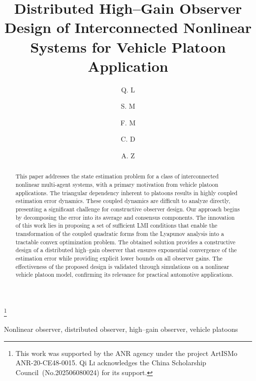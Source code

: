 \documentclass{ifacconf}
\begin{document}
\begin{frontmatter}

\title{Distributed High--Gain Observer Design of Interconnected Nonlinear Systems for Vehicle Platoon Application} 

\thanks[footnoteinfo]{This work was supported by the ANR agency under the project ArtISMo ANR-20-CE48-0015. 
Qi L\textsc{i} acknowledges the China Scholarship Council~(No.202506080024) for its support.}

\author[First]{Q. L} 
\author[First]{S. M}
\author[Second]{F. M}
\author[First]{C. D}
\author[First]{A. Z}

\address[First]{Universit\'e de Lorraine, CNRS, CRAN, F-57000 Metz, France~(e-mail: qi.li@univ-lorraine.fr).}
\address[Second]{School of Control Engineering, 
   Northeastern University at Qinhuangdao, 06600, China.}

\begin{abstract}                %
This paper addresses the state estimation problem for a class of interconnected nonlinear multi-agent systems, with a primary motivation from vehicle platoon applications. The triangular dependency inherent to platoons results in highly coupled estimation error dynamics. These coupled dynamics are difficult to analyze directly, presenting a significant challenge for constructive observer design. Our approach begins by decomposing the error into its average and consensus components. The innovation of this work lies in proposing a set of sufficient LMI conditions that enable the transformation of the coupled quadratic forms from the Lyapunov analysis into a tractable convex optimization problem. The obtained solution provides a constructive design of a distributed high--gain observer that ensures exponential convergence of the estimation error while providing explicit lower bounds on all observer gains. The effectiveness of the proposed design is validated through simulations on a nonlinear vehicle platoon model, confirming its relevance for practical automotive applications.

\end{abstract}

\begin{keyword}
Nonlinear observer, distributed observer, high--gain observer, vehicle platoons
\end{keyword}

\end{frontmatter}
\end{document}
